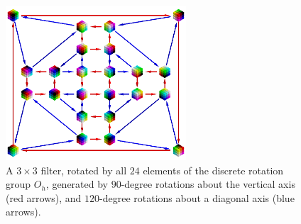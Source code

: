 \begin{figure}[h!]
    \centering
    \includegraphics[width=0.6\textwidth]{figures/Oh}
    \caption{A $3 \times 3$ filter, rotated by all $24$ elements of the discrete rotation group $O_h$, generated by $90$-degree rotations about the vertical axis (red arrows), and $120$-degree rotations about a diagonal axis (blue arrows). 
    }
    \label{fig:cayley-diagram-Oh}
\end{figure}

